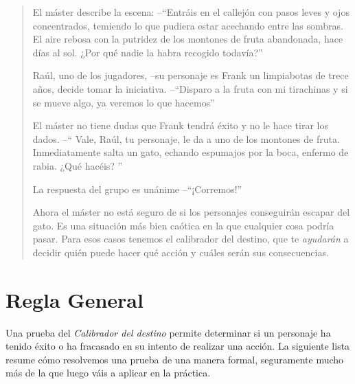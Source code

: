
\begin{quotation}

\noindent El máster describe la escena: --\enquote{Entráis en el callejón con pasos
 leves y ojos concentrados, temiendo lo que pudiera estar acechando entre 
 las sombras. El aire rebosa con la putridez de los montones de fruta abandonada, 
 hace días al sol. ¿Por qué nadie la habra recogido todavía?}

Raúl, uno de los jugadores, --su personaje es Frank un limpiabotas de trece años, 
decide tomar la iniciativa. --\enquote{Disparo a la fruta con mi tirachinas 
y si se mueve algo, ya veremos lo que hacemos}

El máster no tiene dudas que Frank tendrá éxito y no le hace tirar los dados. --\enquote{
Vale, Raúl, tu personaje, le da a uno de los montones de fruta. Inmediatamente
salta un gato, echando espumajos por la boca, enfermo de rabia. ¿Qué hacéis?
}

La respuesta del grupo es unánime --\enquote{¡Corremos!} 

Ahora el máster no está seguro de si los personajes conseguirán escapar del gato.
Es una situación más bien caótica en la que cualquier cosa podría pasar. Para esos
casos tenemos el calibrador del destino, que te \emph{ayudarán} a decidir quién puede 
hacer qué acción y cuáles serán sus consecuencias.

\end{quotation}

\section{Regla General}

Una prueba del \emph{Calibrador del destino} 
permite determinar si un personaje ha tenido éxito o ha fracasado 
en su intento de realizar una acción. La siguiente lista resume 
cómo resolvemos una prueba de una manera formal, seguramente mucho 
más de la que luego váis a aplicar en la práctica.

